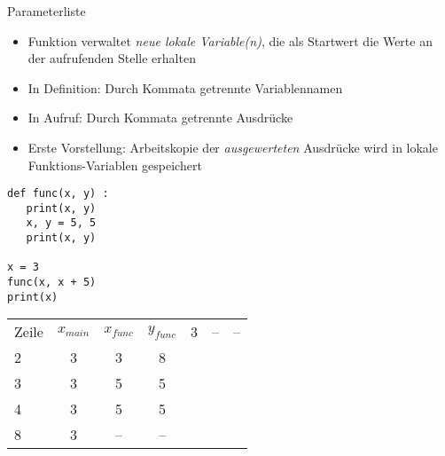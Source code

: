 
\begin{frame}[fragile]{Parameterliste}
%
\begin{itemize}
\item Funktion verwaltet \emph{neue lokale Variable(n)}, die als Startwert die Werte an der aufrufenden Stelle erhalten
\item In Definition: Durch Kommata getrennte Variablennamen
\item In Aufruf: Durch Kommata getrennte Ausdrücke
\item Erste Vorstellung: Arbeitskopie der \emph{ausgewerteten} Ausdrücke wird in lokale Funktions-Variablen gespeichert
\end{itemize}
%
\begin{tcbraster}[raster columns=2,
                  raster equal height,
                  nobeforeafter,
                  raster column skip=0.5cm]
\begin{codebox}
\begin{verbatim}
def func(x, y) :
   print(x, y)
   x, y = 5, 5
   print(x, y)

x = 3
func(x, x + 5)
print(x)   
\end{verbatim}
\end{codebox}
%
\begin{tcolorbox}[title=Bild der Speicherstellen]
\scriptsize
\begin{tabular}{l|ccc}
Zeile & $x_{main}$ & $x_{func}$ & $y_{func}$  & 3 & -- & -- \\
2 & 3 &  3 &  8 \\
3 & 3 &  5 &  5 \\
4 & 3 &  5 &  5 \\
8 & 3 & -- & --
\end{tabular}
\end{tcolorbox}
\end{tcbraster}
%
\end{frame}


